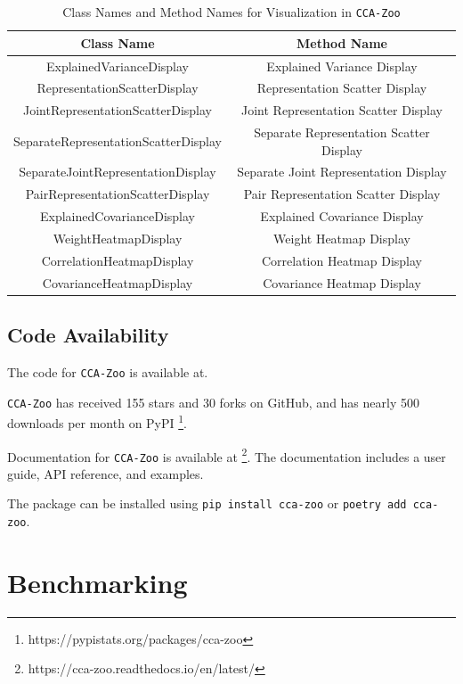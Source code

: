 \begin{table}[ht]
    \centering
    \begin{tabular}{|c|c|}
        \hline
        Class Name & Method Name \\
        \hline
        ExplainedVarianceDisplay & Explained Variance Display \\
        RepresentationScatterDisplay & Representation Scatter Display \\
        JointRepresentationScatterDisplay & Joint Representation Scatter Display \\
        SeparateRepresentationScatterDisplay & Separate Representation Scatter Display \\
        SeparateJointRepresentationDisplay & Separate Joint Representation Display \\
        PairRepresentationScatterDisplay & Pair Representation Scatter Display \\
        ExplainedCovarianceDisplay & Explained Covariance Display \\
        WeightHeatmapDisplay & Weight Heatmap Display \\
        CorrelationHeatmapDisplay & Correlation Heatmap Display \\
        CovarianceHeatmapDisplay & Covariance Heatmap Display \\
        \hline
    \end{tabular}
    \caption{Class Names and Method Names for Visualization in \texttt{CCA-Zoo}}\label{tab:vis_method}
\end{table}

\subsection{Code Availability}

The code for \texttt{CCA-Zoo} is available at.

\texttt{CCA-Zoo} has received 155 stars and 30 forks on GitHub, and has nearly 500 downloads per month on PyPI \footnote{https://pypistats.org/packages/cca-zoo}.

Documentation for \texttt{CCA-Zoo} is available at \footnote{https://cca-zoo.readthedocs.io/en/latest/}.
The documentation includes a user guide, API reference, and examples.

The package can be installed using \texttt{pip install cca-zoo} or \texttt{poetry add cca-zoo}.

\section{Benchmarking}

